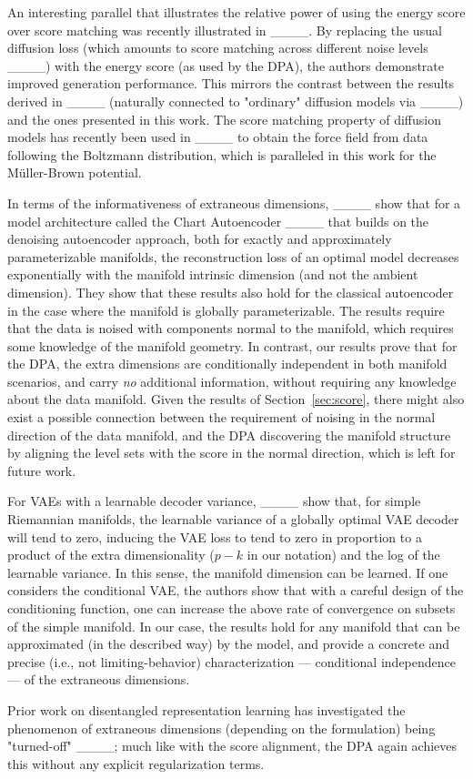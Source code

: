 An interesting parallel that illustrates the relative power of using the energy score over score matching was recently illustrated in ____. By replacing the usual diffusion loss (which amounts to score matching across different noise levels ____) with the energy score (as used by the DPA), the authors demonstrate improved generation performance. This mirrors the contrast between the results derived in ____ (naturally connected to "ordinary" diffusion models via ____) and the ones presented in this work.
The score matching property of diffusion models has recently been used in ____ to obtain the force field from data following the Boltzmann distribution, which is paralleled in this work for the Müller-Brown potential.





In terms of the informativeness of extraneous dimensions, ____ show that for a model architecture called the Chart Autoencoder ____ that builds on the denoising autoencoder approach, both for exactly and approximately parameterizable manifolds, the reconstruction loss of an optimal model decreases exponentially with the manifold intrinsic dimension (and not the ambient dimension). They show that these results also hold for the classical autoencoder in the case where the manifold is globally parameterizable. The results require that the data is noised with components normal to the manifold, which requires some knowledge of the manifold geometry. In contrast, our results prove that for the DPA, the extra dimensions are conditionally independent in both manifold scenarios, and carry \textit{no} additional information, without requiring any knowledge about the data manifold. Given the results of Section~\ref{sec:score}, there might also exist a possible connection between the requirement of noising in the normal direction of the data manifold, and the DPA discovering the manifold structure by aligning the level sets with the score in the normal direction, which is left for future work.

For VAEs with a learnable decoder variance, ____ show that, for simple Riemannian manifolds, the learnable variance of a globally optimal VAE decoder will tend to zero, inducing the VAE loss to tend to zero in proportion to a product of the extra dimensionality ($p-k$ in our notation) and the log of the learnable variance. In this sense, the manifold dimension can be learned. If one considers the conditional VAE, the authors show that with a careful design of the conditioning function, one can increase the above rate of convergence on subsets of the simple manifold. In our case, the results hold for any manifold that can be approximated (in the described way) by the model, and provide a concrete and precise (i.e., not limiting-behavior) characterization --- conditional independence --- of the extraneous dimensions.

Prior work on disentangled representation learning has investigated the phenomenon of extraneous dimensions (depending on the formulation) being "turned-off" ____; much like with the score alignment, the DPA again achieves this without any explicit regularization terms.